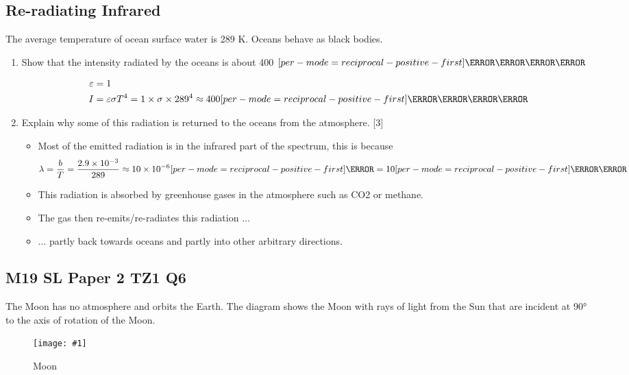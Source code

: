 \documentclass[a4paper,12pt]{article}
\let\oldsi\si
\renewcommand{\si}[1]{\oldsi[per-mode=reciprocal-positive-first]{#1}}
\newcommand{\img}[4]{\begin{center}
  \begin{figure}[H]
    \centering
    \texttt{[image: \#1]}
    \caption{#3}
    \label{fig:#4}
  \end{figure}
\end{center}}
\begin{document}
\subsection{Re-radiating Infrared}

The average temperature of ocean surface water is 289 K. Oceans behave as black bodies.
\begin{enumerate}[label=(\alph*)]
  \item Show that the intensity radiated by the oceans is about 400 $\si{\W\per\m\squared}$

        \begin{align*}
          \varepsilon & = 1                                                                                       \\
          I           & = \varepsilon \sigma T^4 = 1 \times \sigma \times 289^4 \approx 400 \si{\W\per\m\squared}
        \end{align*}
  \item Explain why some of this radiation is returned to the oceans from the atmosphere. [3]
        \begin{itemize}
          \item Most of the emitted radiation is in the infrared part of the spectrum, this is because $$\lambda = \frac{b}{T} = \frac{2.9 \times 10^{-3}}{289} \approx 10 \times 10^{-6} \si{\m} = 10 \si{\micro\m}$$
          \item This radiation is absorbed by greenhouse gases in the atmosphere such as CO2 or methane.
          \item The gas then re-emits/re-radiates this radiation ...
          \item ... partly back towards oceans and partly into other arbitrary directions.
        \end{itemize}
\end{enumerate}

\pagebreak

\subsection{M19 SL Paper 2 TZ1 Q6}

The Moon has no atmosphere and orbits the Earth. The diagram shows the Moon with rays
of light from the Sun that are incident at 90° to the axis of rotation of the Moon.

\img{ex/1.png}{0.7}{Moon}{moon}
\end{document}
